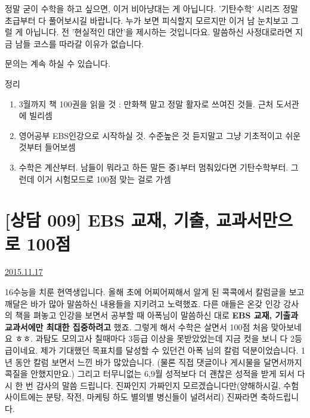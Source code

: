 정말 굳이 수학을 하고 싶으면, 이거 비아냥대는 게 아닙니다. '기탄수학' 시리즈 정말 초급부터 다 풀어보시길 바랍니다.
누가 보면 피식할지 모르지만 이거 남 눈치보고 그럴 게 아닙니다. 전 '현실적인 대안'을 제시하는 것입니다요.
말씀하신 사정대로라면 지금 남들 코스를 따라갈 이유가 없습니다.
\vspace{5mm}

문의는 계속 하실 수 있습니다.
\vspace{5mm}

정리
\vspace{5mm}

\begin{enumerate}
    
    \item  3월까지 책 100권을 읽을 것 : 만화책 말고 정말 활자로 쓰여진 것들. 근처 도서관에 빌리셈
    \item  영어공부 EBS인강으로 시작하실 것. 수준높은 것 듣지말고 그냥 기초적이고 쉬운 것부터 들어보셈
    \item  수학은 계산부터. 남들이 뭐라고 하든 말든 중1부터 멈춰있다면 기탄수학부터. 그런데 이거 시험모드로 100점 맞는 걸로 가셈
\end{enumerate}
\vspace{5mm}



\section{[상담 009] EBS 교재, 기출, 교과서만으로 100점}
\href{https://www.kockoc.com/Apoc/495366}{2015.11.17}


\vspace{5mm}

    16수능을 치룬 현역생입니다. 올해 초에 어찌어찌해서 알게 된 콕콕에서 칼럼글을 보고 깨달은 바가 많아 말씀하신 내용들을 지키려고 노력했죠. 다른 애들은 온갖 인강 강사의 책을 펴놓고 인강을 보면서 공부할 때 아폭님이 말씀하신 대로 \textbf{EBS 교재, 기출과 교과서에만 최대한 집중하려고} 했죠. 그렇게 해서 수학은 살면서 100점 처음 맞아보네요 ㅎㅎ. 과탐도 모의고사 칠때마다 3등급 이상을 못받았었는데 지금 컷을 보니 다 2등급이네요. 제가 기대했던 목표치를 달성할 수 있던건 아폭 님의 칼럼 덕분이었습니다. 1년 동안 칼럼 보면서 느낀 바가 많았습니다. (물론 직접 댓글이나 게시물을 달면서까지 콕질을 안했지만요.) 그리고 터무니없는 6,9월 성적보다 더 괜찮은 성적을 받게 되서 다시 한 번 감사의 말씀 드립니다.
    \vspace{5mm}
진짜인지 가짜인지 모르겠습니다만(양해하시길, 수험사이트에는 분탕, 작전, 마케팅 하도 별의별 병신들이 널려서리)
진짜라면 축하드립니다.
\vspace{5mm}

